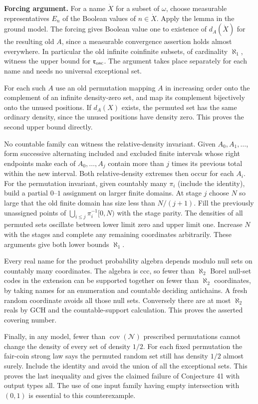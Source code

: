 \documentclass[11pt]{article}
\begin{document}
\textbf{Forcing argument.} For a name \(\dot X\) for a subset of \(\omega\), choose measurable representatives \(E_n\) of the Boolean values of \(n\in\dot X\). Apply the lemma in the ground model. The forcing gives Boolean value one to existence of \(d_A(\dot X)\) for the resulting old \(A\), since a measurable convergence assertion holds almost everywhere. In particular the old infinite coinfinite subsets, of cardinality \(\aleph_1\), witness the upper bound for \(\mathfrak r_{\rm osc}\). The argument takes place separately for each name and needs no universal exceptional set.

For each such \(A\) use an old permutation mapping \(A\) in increasing order onto the complement of an infinite density-zero set, and map its complement bijectively onto the unused positions. If \(d_A(X)\) exists, the permuted set has the same ordinary density, since the unused positions have density zero. This proves the second upper bound directly.

No countable family can witness the relative-density invariant. Given \(A_0,A_1,\ldots\), form successive alternating included and excluded finite intervals whose right endpoints make each of \(A_0,\ldots,A_j\) contain more than \(j\) times its previous total within the new interval. Both relative-density extremes then occur for each \(A_i\). For the permutation invariant, given countably many \(\pi_i\) (include the identity), build a partial \(0\)--\(1\) assignment on larger finite domains. At stage \(j\) choose \(N\) so large that the old finite domain has size less than \(N/(j+1)\). Fill the previously unassigned points of \(\bigcup_{i\le j}\pi_i^{-1}[0,N)\) with the stage parity. The densities of all permuted sets oscillate between lower limit zero and upper limit one. Increase \(N\) with the stages and complete any remaining coordinates arbitrarily. These arguments give both lower bounds \(\aleph_1\).

Every real name for the product probability algebra depends modulo null sets on countably many coordinates. The algebra is ccc, so fewer than \(\aleph_2\) Borel null-set codes in the extension can be supported together on fewer than \(\aleph_2\) coordinates, by taking names for an enumeration and countable deciding antichains. A fresh random coordinate avoids all those null sets. Conversely there are at most \(\aleph_2\) reals by GCH and the countable-support calculation. This proves the asserted covering number.

Finally, in any model, fewer than \(\operatorname{cov}(\mathcal N)\) prescribed permutations cannot change the density of every set of density \(1/2\). For each fixed permutation the fair-coin strong law says the permuted random set still has density \(1/2\) almost surely. Include the identity and avoid the union of all the exceptional sets. This proves the last inequality and gives the claimed failure of Conjecture 41 with output types \(\mathrm{all}\). The use of one input family having empty intersection with \((0,1)\) is essential to this counterexample.
\end{document}
